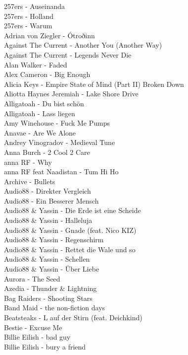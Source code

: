 257ers - Auseinanda\\
257ers - Holland\\
257ers - Warum\\
Adrian von Ziegler - Ótroðinn\\
Against The Current - Another You (Another Way)\\
Against The Current - Legends Never Die\\
Alan Walker - Faded\\
Alex Cameron - Big Enough\\
Alicia Keys - Empire State of Mind (Part II) Broken Down\\
Aliotta Haynes Jeremiah - Lake Shore Drive\\
Alligatoah - Du bist schön\\
Alligatoah - Lass liegen\\
Amy Winehouse - Fuck Me Pumps\\
Anavae - Are We Alone\\
Andrey Vinogradov - Medieval Tune\\
Anna Burch - 2 Cool 2 Care\\
anna RF - Why\\
anna RF feat Naadistan -  Tum Hi Ho\\
Archive - Bullets\\
Audio88 - Direkter Vergleich\\
Audio88 - Ein Besserer Mensch\\
Audio88 \& Yassin - Die Erde ist eine Scheide\\
Audio88 \& Yassin - Halleluja\\
Audio88 \& Yassin - Gnade (feat. Nico KIZ)\\
Audio88 \& Yassin - Regenschirm\\
Audio88 \& Yassin - Rettet die Wale und so\\
Audio88 \& Yassin - Schellen\\
Audio88 \& Yassin - Über Liebe\\
Aurora - The Seed\\
Azedia - Thunder \& Lightning\\
Bag Raiders - Shooting Stars\\
Band Maid - the non-fiction days\\
Beatsteaks - L auf der Stirn (feat. Deichkind)\\
Bestie - Excuse Me\\
Billie Eilish - bad guy\\
Billie Eilish - bury a friend\\
